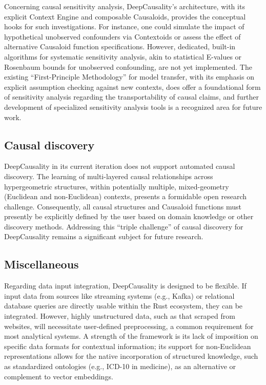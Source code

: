 Concerning causal sensitivity analysis, DeepCausality's architecture, with its explicit Context Engine and composable Causaloids, provides the conceptual hooks for such investigations. For instance, one could simulate the impact of hypothetical unobserved confounders via Contextoids or assess the effect of alternative Causaloid function specifications. However, dedicated, built-in algorithms for systematic sensitivity analysis, akin to statistical E-values or Rosenbaum bounds for unobserved confounding, are not yet implemented. The existing ``First-Principle Methodology'' for model transfer, with its emphasis on explicit assumption checking against new contexts, does offer a foundational form of sensitivity analysis regarding the transportability of causal claims, and further development of specialized sensitivity analysis tools is a recognized area for future work.

\subsection{Causal discovery}

DeepCausality in its current iteration does not support automated causal discovery. The learning of multi-layered causal relationships across hypergeometric structures, within potentially multiple, mixed-geometry (Euclidean and non-Euclidean) contexts, presents a formidable open research challenge. Consequently, all causal structures and Causaloid functions must presently be explicitly defined by the user based on domain knowledge or other discovery methods. Addressing this ``triple challenge'' of causal discovery for DeepCausality remains a significant subject for future research.

\subsection{Miscellaneous}


Regarding data input integration, DeepCausality is designed to be flexible. If input data from sources like streaming systems (e.g., Kafka) or relational database queries are directly usable within the Rust ecosystem, they can be integrated. However, highly unstructured data, such as that scraped from websites, will necessitate user-defined preprocessing, a common requirement for most analytical systems. A strength of the framework is its lack of imposition on specific data formats for contextual information; its support for non-Euclidean representations allows for the native incorporation of structured knowledge, such as standardized ontologies (e.g., ICD-10 in medicine), as an alternative or complement to vector embeddings.

